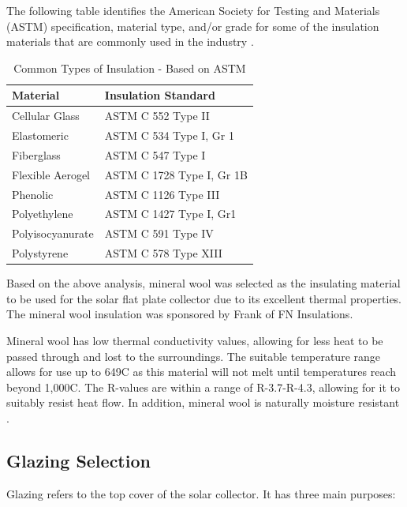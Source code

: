 \medskip
The following table identifies the American Society for Testing and Materials (ASTM) specification, material type, and/or grade for some of the insulation materials that are commonly used in the industry \cite{insulation_design}.

\medskip
\begin{table}[H]
\centering
\caption{Common Types of Insulation - Based on ASTM}
\begin{tabular}{|P{50mm}|P{50mm}|}
    \hline
    Material & Insulation Standard \\
    \hline
    Cellular Glass   & ASTM C 552 Type II        \\
    Elastomeric      & ASTM C 534 Type I, Gr 1   \\
    Fiberglass       & ASTM C 547 Type I         \\
    Flexible Aerogel & ASTM C 1728 Type I, Gr 1B \\
    Phenolic         & ASTM C 1126 Type III      \\
    Polyethylene     & ASTM C 1427 Type I, Gr1   \\
    Polyisocyanurate & ASTM C 591 Type IV        \\
    Polystyrene      & ASTM C 578 Type XIII      \\
    \hline
\end{tabular}
\end{table}

\medskip
Based on the above analysis, mineral wool was selected as the insulating material to be used for the solar flat plate collector due to its excellent thermal properties. The mineral wool insulation was sponsored by Frank of FN Insulations. 

\medskip
Mineral wool has low thermal conductivity values, allowing for less heat to be passed through and lost to the surroundings. The suitable temperature range allows for use up to 649\textdegree C as this material will not melt until temperatures reach beyond 1,000\textdegree C. The R-values are within a range of R-3.7-R-4.3, allowing for it to suitably resist heat flow. In addition, mineral wool is naturally moisture resistant \cite{mineral_wool}.

\subsection{Glazing Selection}

Glazing refers to the top cover of the solar collector. It has three main purposes:

